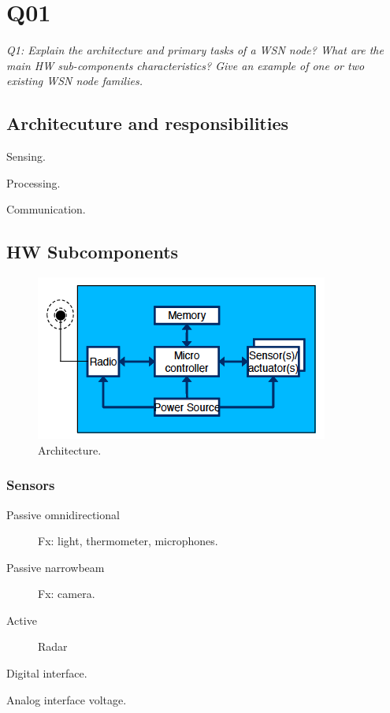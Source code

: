 \chapter{Q01}
\emph{Q1: Explain the architecture and primary tasks of a WSN node? What are
the main HW sub-components characteristics? Give an example of one or two
existing WSN node families.}

\section{Architecuture and responsibilities}

\begin{description}
\item Sensing.
\item Processing.
\item Communication.
\end{description}

\section{HW Subcomponents}

\begin{figure}[h]
  \centering
  \includegraphics[scale=0.5]{img/moteAnatomy.png}
  \caption{Architecture.}
\end{figure}

\subsection{Sensors}
\begin{description}
\item[Passive omnidirectional] Fx: light, thermometer, microphones.
\item[Passive narrowbeam] Fx: camera.
\item[Active] Radar
\end{description}

\begin{description}
\item Digital interface.
\item Analog interface voltage.
\end{description}

